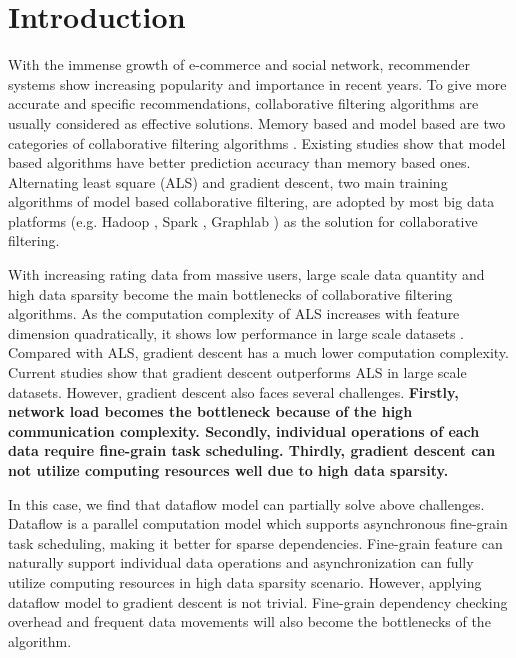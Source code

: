 \documentclass{llncs}
\begin{document}
\vspace{-30pt}
\section{Introduction}
\vspace{-5pt}

With the immense growth of e-commerce and social network, recommender systems show increasing popularity and importance in recent years. To give more accurate and specific recommendations, collaborative filtering \cite{towards} algorithms are usually considered as effective solutions. Memory based and model based are two categories of collaborative filtering algorithms \cite{MemoryBasedCF}. Existing studies \cite{MF2009} \cite{recSurvey2013} show that model based algorithms have better prediction accuracy than memory based ones.
Alternating least square (ALS) and gradient descent, two main training algorithms of model based collaborative filtering, are adopted by most big data platforms (e.g. Hadoop \cite{Hadoop}, Spark \cite{SparkMllib}, Graphlab \cite{graphlab}) as the solution for collaborative filtering.

With increasing rating data from massive users, large scale data quantity and high data sparsity become the main bottlenecks of collaborative filtering algorithms. As the computation complexity of ALS increases with feature dimension quadratically, it shows low performance in large scale datasets \cite{ibm2011}. Compared with ALS, gradient descent has a much lower computation complexity. Current studies \cite{sgdKdd2015} \cite{sgdFast2015} \cite{ibm2011} show that gradient descent outperforms ALS in large scale datasets. However, gradient descent also faces several challenges. \textbf{Firstly, network load becomes the bottleneck because of the high communication complexity. Secondly, individual operations of each data require fine-grain task scheduling. Thirdly, gradient descent can not utilize computing resources well due to high data sparsity.}

In this case, we find that dataflow model can partially solve above challenges.
Dataflow \cite{dataflow} is a parallel computation model which
supports asynchronous fine-grain task scheduling, making it
better for sparse dependencies. Fine-grain feature can naturally support individual data operations and asynchronization can fully utilize computing resources in high data sparsity scenario. However, applying dataflow model to gradient descent is not trivial. Fine-grain dependency checking overhead and frequent data movements will also become the bottlenecks of the algorithm.
\end{document}
